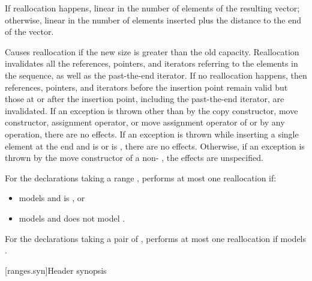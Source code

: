 \documentclass{wg21}
\begin{document}
\begin{itemdescr}
    \pnum
    \complexity
    If reallocation happens,
    linear in the number of elements of the resulting vector;
    otherwise,
    linear in the number of elements inserted plus the distance
    to the end of the vector.

    \pnum
    \remarks
    Causes reallocation if the new size is greater than the old capacity.
    Reallocation invalidates all the references, pointers, and iterators
    referring to the elements in the sequence, as well as the past-the-end iterator.
    If no reallocation happens, then
    references, pointers, and iterators
    before the insertion point remain valid
    but those at or after the insertion point,
    including the past-the-end iterator,
    are invalidated.
    If an exception is thrown other than by
    the copy constructor, move constructor,
    assignment operator, or move assignment operator of
     or by any  operation,
    there are no effects.
    If an exception is thrown while inserting a single element at the end and
     is  or 
    is , there are no effects.
    Otherwise, if an exception is thrown by the move constructor of a non-
    , the effects are unspecified.

    \begin{addedblock}
    For the declarations taking a range , performs at most one reallocation if:
    \begin{itemize}
        \item {} models  and  is , or
        \item {} models   and
        	       does not model .
    \end{itemize}
     For the declarations taking a pair of , performs at most one reallocation if  models .
    \end{addedblock}

\end{itemdescr}


[ranges.syn]{Header  synopsis}
\end{document}
